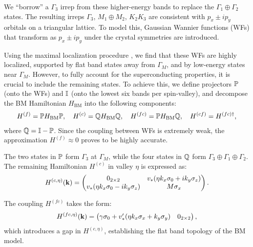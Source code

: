 We ``borrow'' a $\Gamma_3$ irrep from these higher-energy bands to replace the $\Gamma_1 \oplus \Gamma_2$ states. The resulting irreps $\Gamma_3$, $M_1 \oplus M_2$, $K_2 K_3$ are consistent with $p_x \pm i p_y$ orbitals on a triangular lattice. To model this, Gaussian Wannier functions (WFs) that transform as $p_x \pm i p_y$ under the crystal symmetries are introduced.

Using the maximal localization procedure \cite{maxlocalWFs_marzari2012, wannier90}, we find that these WFs are highly localized, supported by flat band states away from $\Gamma_M$, and by low-energy states near $\Gamma_M$. However, to fully account for the superconducting properties, it is crucial to include the remaining states. To achieve this, we define projectors ${\mathbb{P}}$ (onto the WFs) and ${\mathbb{I}}$ (onto the lowest six bands per spin-valley), and decompose the BM Hamiltonian $H_\text{BM}$ into the following components:
\begin{equation} \label{eq:projected_hamiltonians_WFs_PQ}
H^{(f)} = {\mathbb{P}} H_\text{BM} {\mathbb{P}}, \quad H^{(c)} = {\mathbb{Q}} H_\text{BM} {\mathbb{Q}}, \quad H^{(fc)} = {\mathbb{P}} H_\text{BM} {\mathbb{Q}}, \quad H^{(cf)} = H^{(fc)\dagger},
\end{equation}
where ${\mathbb{Q}} = {\mathbb{I}} - {\mathbb{P}}$. Since the coupling between WFs is extremely weak, the approximation $H^{(f)} \approx 0$ proves to be highly accurate.

The two states in ${\mathbb{P}}$ form $\Gamma_3$ at $\Gamma_M$, while the four states in ${\mathbb{Q}}$ form $\Gamma_3 \oplus \Gamma_1 \oplus \Gamma_2$. The remaining Hamiltonian $H^{(c)}$ in valley $\eta$ is expressed as:
\begin{equation} \label{eq:H(c)_topoheavyfermion}
H^{(c, \eta)}({\vb{k}}) =
\begin{pmatrix}
0_{2\times 2} & v_* (\eta k_x \sigma_0 + i k_y \sigma_z) \\
v_* (\eta k_x \sigma_0 - i k_y \sigma_z) & M \sigma_x
\end{pmatrix}.
\end{equation}

The coupling $H^{(fc)}$ takes the form:
\begin{equation} \label{eq:H(fc)_topoheavyfermion}
H^{(fc, \eta)}({\vb{k}}) =
\begin{pmatrix}
\gamma \sigma_0 + v'_* (\eta k_x \sigma_x + k_y \sigma_y) & 0_{2\times 2}
\end{pmatrix},
\end{equation}
which introduces a gap in $H^{(c, \eta)}$, establishing the flat band topology of the BM model.

